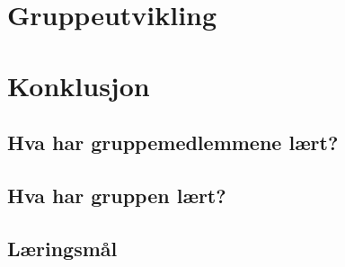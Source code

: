 \documentclass[DIV=calc, paper=a4, fontsize=12pt]{scrartcl}	 %
\begin{document}
\begin{multicols}{2}

\end{multicols}


\section{Gruppeutvikling}

\begin{multicols}{2}









\end{multicols}


\section{Konklusjon}

\begin{multicols}{2}

\subsection{Hva har gruppemedlemmene lært?}

\subsection{Hva har gruppen lært?}

\subsection{Læringsmål}

\end{multicols}



\onecolumn
\small{

}


\pagebreak


\end{document}
